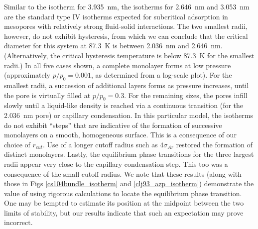 Similar to the isotherm for 3.935~nm, the isotherms for 2.646~nm and 3.053~nm are the standard type IV isotherms expected for subcritical adsorption in mesopores with relatively strong fluid-solid interactions. The two smallest radii, however, do not exhibit hysteresis, from which we can conclude that the critical diameter for this system at 87.3~K is between 2.036~nm and 2.646~nm. (Alternatively, the critical hysteresis temperature is below 87.3~K for the smallest radii.) In all five cases shown, a complete monolayer forms at low pressure (approximately $p/p_0 = 0.001$, as determined from a log-scale plot). For the smallest radii, a succession of additional layers forms as pressure increases, until the pore is virtually filled at $p/p_0=0.3$. For the remaining sizes, the pores infill slowly until a liquid-like density is reached via a continuous transition (for the 2.036~nm pore) or capillary condensation. In this particular model, the isotherms do not exhibit ``steps'' that are indicative of the formation of successive monolayers on a smooth, homogeneous surface. This is a consequence of our choice of $r_{cut}$. Use of a longer cutoff radius such as $4\sigma_{Ar}$ restored the formation of distinct monolayers. Lastly, the equilibrium phase transitions for the three largest radii appear very close to the capillary condensation step. This too was a consequence of the small cutoff radius. We note that these results (along with those in Figs \ref{cs104bundle_isotherm} and \ref{clj93_azp_isotherm}) demonstrate the value of using rigorous calculations to locate the equilibrium phase transition. One may be tempted to estimate its position at the midpoint between the two limits of stability, but our results indicate that such an expectation may prove incorrect.

